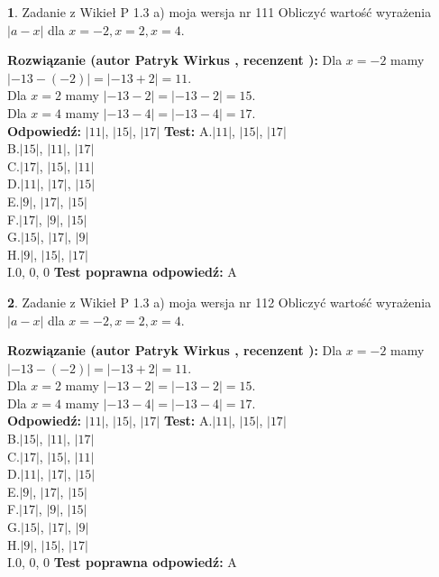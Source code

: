\documentclass[12pt, a4paper]{article}
\theoremstyle{definition} %
\newtheorem{zad}{}
\newcommand{\zadStart}[1]{\begin{zad}#1\newline}
\newcommand{\zadStop}{\end{zad}}
\newcommand{\rozwStart}[2]{\noindent \textbf{Rozwiązanie (autor #1 , recenzent #2): }\newline}
\newcommand{\rozwStop}{\newline}
\newcommand{\odpStart}{\noindent \textbf{Odpowiedź:}\newline}
\newcommand{\odpStop}{\newline}
\newcommand{\testStart}{\noindent \textbf{Test:}\newline}
\newcommand{\testStop}{\newline}
\newcommand{\kluczStart}{\noindent \textbf{Test poprawna odpowiedź:}\newline}
\newcommand{\kluczStop}{\newline}
\begin{document}
\zadStart{Zadanie z Wikieł P 1.3 a) moja wersja nr 111}
Obliczyć wartość wyrażenia $|a - x|$ dla $x=-2,x=2,x=4$.
\zadStop
\rozwStart{Patryk Wirkus}{}
Dla $x = -2$ mamy $|-13 - (-2)| = |-13 + 2| = 11$.\\
Dla $x = 2$ mamy $|-13 - 2| = |-13 - 2| = 15$.\\
Dla $x = 4$ mamy $|-13 - 4| = |-13 - 4| = 17$.\\
\rozwStop
\odpStart
$|11|$, $|15|$, $|17|$
\odpStop
\testStart
A.$|11|$, $|15|$, $|17|$\\
B.$|15|$, $|11|$, $|17|$\\
C.$|17|$, $|15|$, $|11|$\\
D.$|11|$, $|17|$, $|15|$\\
E.$|9|$, $|17|$, $|15|$\\
F.$|17|$, $|9|$, $|15|$\\
G.$|15|$, $|17|$, $|9|$\\
H.$|9|$, $|15|$, $|17|$\\
I.$0$, $0$, $0$
\testStop
\kluczStart
A
\kluczStop



\zadStart{Zadanie z Wikieł P 1.3 a) moja wersja nr 112}
Obliczyć wartość wyrażenia $|a - x|$ dla $x=-2,x=2,x=4$.
\zadStop
\rozwStart{Patryk Wirkus}{}
Dla $x = -2$ mamy $|-13 - (-2)| = |-13 + 2| = 11$.\\
Dla $x = 2$ mamy $|-13 - 2| = |-13 - 2| = 15$.\\
Dla $x = 4$ mamy $|-13 - 4| = |-13 - 4| = 17$.\\
\rozwStop
\odpStart
$|11|$, $|15|$, $|17|$
\odpStop
\testStart
A.$|11|$, $|15|$, $|17|$\\
B.$|15|$, $|11|$, $|17|$\\
C.$|17|$, $|15|$, $|11|$\\
D.$|11|$, $|17|$, $|15|$\\
E.$|9|$, $|17|$, $|15|$\\
F.$|17|$, $|9|$, $|15|$\\
G.$|15|$, $|17|$, $|9|$\\
H.$|9|$, $|15|$, $|17|$\\
I.$0$, $0$, $0$
\testStop
\kluczStart
A
\kluczStop
\end{document}
